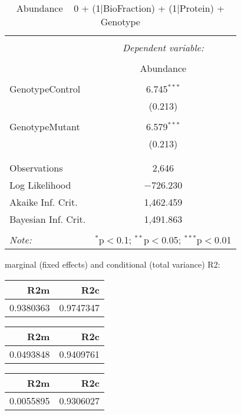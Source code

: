 \documentclass[11pt]{report}
\begin{document}
\begin{table}[!htbp] \centering 
  \caption{Abundance ~ 0 + (1|BioFraction) + (1|Protein) + Genotype} 
  \label{} 
\begin{tabular}{@{\extracolsep{5pt}}lc} 
\\[-1.8ex]\hline 
\hline \\[-1.8ex] 
 & \multicolumn{1}{c}{\textit{Dependent variable:}} \\ 
\cline{2-2} 
\\[-1.8ex] & Abundance \\ 
\hline \\[-1.8ex] 
 GenotypeControl & 6.745$^{***}$ \\ 
  & (0.213) \\ 
  & \\ 
 GenotypeMutant & 6.579$^{***}$ \\ 
  & (0.213) \\ 
  & \\ 
\hline \\[-1.8ex] 
Observations & 2,646 \\ 
Log Likelihood & $-$726.230 \\ 
Akaike Inf. Crit. & 1,462.459 \\ 
Bayesian Inf. Crit. & 1,491.863 \\ 
\hline 
\hline \\[-1.8ex] 
\textit{Note:}  & \multicolumn{1}{r}{$^{*}$p$<$0.1; $^{**}$p$<$0.05; $^{***}$p$<$0.01} \\ 
\end{tabular} 
\end{table} 
marginal (fixed effects) and conditional (total variance) R2:

\begin{tabular}{r|r}
\hline
R2m & R2c\\
\hline
0.9380363 & 0.9747347\\
\hline
\end{tabular}

\begin{tabular}{r|r}
\hline
R2m & R2c\\
\hline
0.0493848 & 0.9409761\\
\hline
\end{tabular}

\begin{tabular}{r|r}
\hline
R2m & R2c\\
\hline
0.0055895 & 0.9306027\\
\hline
\end{tabular}
\end{document}
